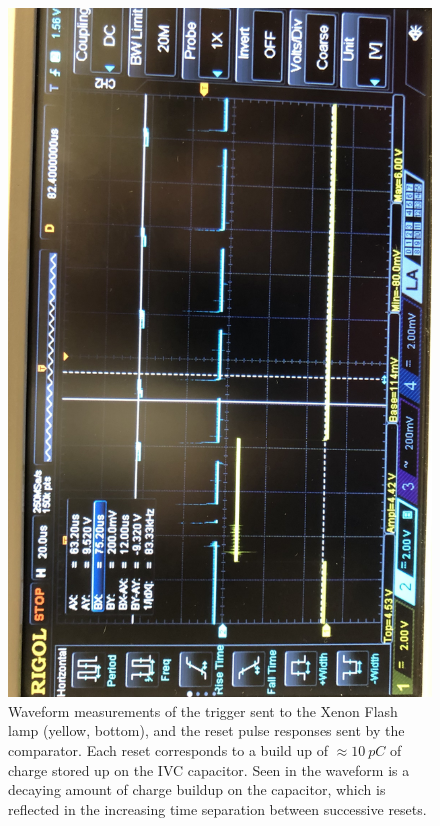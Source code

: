 \begin{figure}[]
\centering
\includegraphics[width=\textwidth]{images/saq_reset_pulse_gem_thickBoard.jpg}
\caption{Waveform measurements of the trigger sent to the Xenon Flash lamp (yellow, bottom), and the reset pulse responses sent by the comparator.
Each reset corresponds to a build up of $\approx 10~\unit{pC}$ of charge stored up on the IVC capacitor.
Seen in the waveform is a decaying amount of charge buildup on the capacitor, which is reflected in the increasing time separation between successive resets.
}
\label{fig:saq_resets}
\end{figure}

